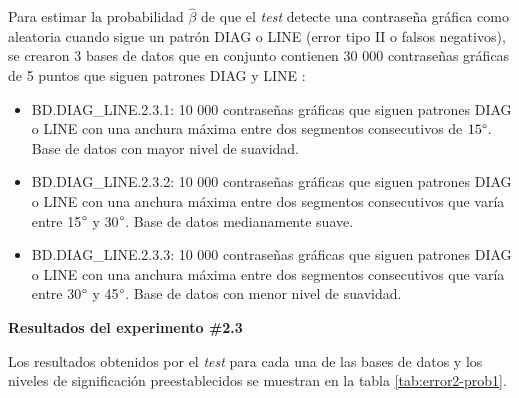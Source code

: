 \documentclass[12pt]{report}
\begin{document}
Para estimar la probabilidad $\hat{\beta}$ de que el \textit{test} detecte una contraseña gráfica como aleatoria cuando sigue un patrón DIAG o LINE (error tipo II o falsos negativos), se crearon 3 bases de datos que en conjunto contienen 30 000 contraseñas gráficas de 5 puntos que siguen patrones DIAG y LINE :
\begin{itemize}
	\item BD.DIAG\_LINE.2.3.1: 10 000 contraseñas gráficas que siguen patrones DIAG o LINE con una anchura máxima entre dos segmentos consecutivos de $15\degree$. Base de datos con mayor nivel de suavidad. 
	\item BD.DIAG\_LINE.2.3.2: 10 000 contraseñas gráficas que siguen patrones DIAG o LINE con una anchura máxima entre dos segmentos consecutivos que varía entre 15$\degree$ y 30$\degree$. Base de datos medianamente suave. 
	\item BD.DIAG\_LINE.2.3.3: 10 000 contraseñas gráficas que siguen patrones DIAG o LINE con una anchura máxima entre dos segmentos consecutivos que varía entre 30$\degree$ y 45$\degree$. Base de datos con menor nivel de suavidad.
\end{itemize}
\textbf{Resultados del experimento \#2.3}

Los resultados obtenidos por el \textit{test}  para cada una de las bases de datos y los  niveles de significación preestablecidos se muestran en la tabla \ref{tab:error2-prob1}.
\end{document}
